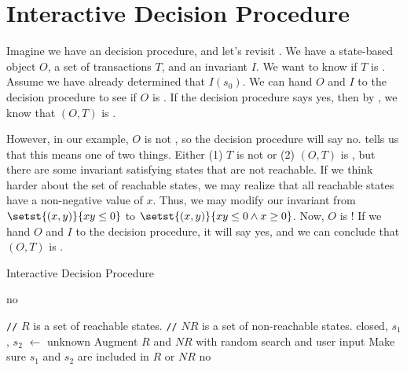 \section{Interactive \Iconfluence{} Decision Procedure}
Imagine we have an \Iclosed{} decision procedure, and let's revisit
. We have a state-based object $O$, a set of
transactions $T$, and an invariant $I$. We want to know if $T$ is
\Iconfluent{}. Assume we have already determined that $I(s_0)$. We can hand $O$
and $I$ to the \Iclosed{} decision procedure to see if $O$ is \Iclosed{}. If
the decision procedure says yes, then by , we know
that $(O, T)$ is \Iconfluent{}.

However, in our example, $O$ is not \Iclosed{}, so the decision procedure will
say no.  tells us that this means one of two
things. Either (1) $T$ is not \Iconfluent{} or (2) $(O, T)$ is \Iconfluent{},
but there are some invariant satisfying states that are not reachable. If we
think harder about the set of reachable states, we may realize that all
reachable states have a non-negative value of $x$. Thus, we may modify our
invariant from $\setst{(x, y)}{xy \leq 0}$ to $\setst{(x, y)}{xy \leq 0 \land x
\geq 0}$. Now, $O$ is \Iclosed{}! If we hand $O$ and $I$ to the decision
procedure, it will say yes, and we can conclude that $(O, T)$ is \Iconfluent{}.

\newcommand{\comment}[1]{\State \textcolor{flatdenim}{\texttt{//} #1}}
\begin{algorithm}
  \caption{Interactive \Iconfluence{} Decision Procedure}%
  \begin{algorithmic}
        \State \Return no
      \Else
        \State \Return {}
      \EndIf
    \EndFunction

    \State

    \comment{$R$ is a set of reachable states.}
    \comment{$NR$ is a set of non-reachable states.}
      \State closed, $s_1$, $s_2$ $\gets$ 
        \State \Return unknown
        \State {}
      \Else
        \State Augment $R$ and $NR$ with random search and user input
        \State Make sure $s_1$ and $s_2$ are included in $R$ or $NR$
          \State \Return no
        \Else
          \State \Return {}
        \EndIf
      \EndIf
    \EndFunction
  \end{algorithmic}
\end{algorithm}


